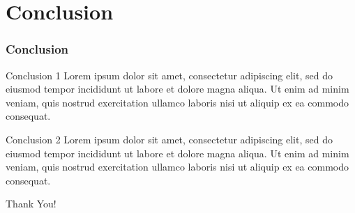 \documentclass[9pt, dvipsnames]{beamer}
\begin{document}
\section{Conclusion}\label{sec:conclusion}
\begin{frame}
\frametitle{Conclusion}
\begin{block}{Conclusion 1}
    Lorem ipsum dolor sit amet, consectetur adipiscing elit, sed do eiusmod tempor incididunt ut labore et dolore magna aliqua.
    Ut enim ad minim veniam, quis nostrud exercitation ullamco laboris nisi ut aliquip ex ea commodo consequat.
\end{block}

\begin{exampleblock}{Conclusion 2}
    Lorem ipsum dolor sit amet, consectetur adipiscing elit, sed do eiusmod tempor incididunt ut labore et dolore magna aliqua.
    Ut enim ad minim veniam, quis nostrud exercitation ullamco laboris nisi ut aliquip ex ea commodo consequat. 
\end{exampleblock}
\end{frame}

\begin{frame}[noframenumbering]
\centering
\fontsize{40}{50}\selectfont Thank You!
\end{frame}
\end{document}
